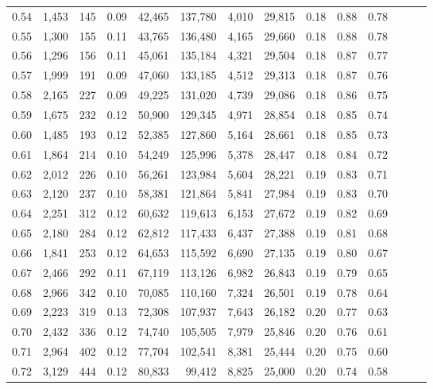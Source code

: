 \begin{tabular}{rrrrrrrrrrrrrr}
0.54 &  1,453 &    145 &  0.09 &   42,465 &  137,780 &   4,010 &  29,815 &  0.18 &  0.88 &      0.78 \\
0.55 &  1,300 &    155 &  0.11 &   43,765 &  136,480 &   4,165 &  29,660 &  0.18 &  0.88 &      0.78 \\
0.56 &  1,296 &    156 &  0.11 &   45,061 &  135,184 &   4,321 &  29,504 &  0.18 &  0.87 &      0.77 \\
0.57 &  1,999 &    191 &  0.09 &   47,060 &  133,185 &   4,512 &  29,313 &  0.18 &  0.87 &      0.76 \\
0.58 &  2,165 &    227 &  0.09 &   49,225 &  131,020 &   4,739 &  29,086 &  0.18 &  0.86 &      0.75 \\
0.59 &  1,675 &    232 &  0.12 &   50,900 &  129,345 &   4,971 &  28,854 &  0.18 &  0.85 &      0.74 \\
0.60 &  1,485 &    193 &  0.12 &   52,385 &  127,860 &   5,164 &  28,661 &  0.18 &  0.85 &      0.73 \\
0.61 &  1,864 &    214 &  0.10 &   54,249 &  125,996 &   5,378 &  28,447 &  0.18 &  0.84 &      0.72 \\
0.62 &  2,012 &    226 &  0.10 &   56,261 &  123,984 &   5,604 &  28,221 &  0.19 &  0.83 &      0.71 \\
0.63 &  2,120 &    237 &  0.10 &   58,381 &  121,864 &   5,841 &  27,984 &  0.19 &  0.83 &      0.70 \\
0.64 &  2,251 &    312 &  0.12 &   60,632 &  119,613 &   6,153 &  27,672 &  0.19 &  0.82 &      0.69 \\
0.65 &  2,180 &    284 &  0.12 &   62,812 &  117,433 &   6,437 &  27,388 &  0.19 &  0.81 &      0.68 \\
0.66 &  1,841 &    253 &  0.12 &   64,653 &  115,592 &   6,690 &  27,135 &  0.19 &  0.80 &      0.67 \\
0.67 &  2,466 &    292 &  0.11 &   67,119 &  113,126 &   6,982 &  26,843 &  0.19 &  0.79 &      0.65 \\
0.68 &  2,966 &    342 &  0.10 &   70,085 &  110,160 &   7,324 &  26,501 &  0.19 &  0.78 &      0.64 \\
0.69 &  2,223 &    319 &  0.13 &   72,308 &  107,937 &   7,643 &  26,182 &  0.20 &  0.77 &      0.63 \\
0.70 &  2,432 &    336 &  0.12 &   74,740 &  105,505 &   7,979 &  25,846 &  0.20 &  0.76 &      0.61 \\
0.71 &  2,964 &    402 &  0.12 &   77,704 &  102,541 &   8,381 &  25,444 &  0.20 &  0.75 &      0.60 \\
0.72 &  3,129 &    444 &  0.12 &   80,833 &   99,412 &   8,825 &  25,000 &  0.20 &  0.74 &      0.58 \\

\end{tabular}
